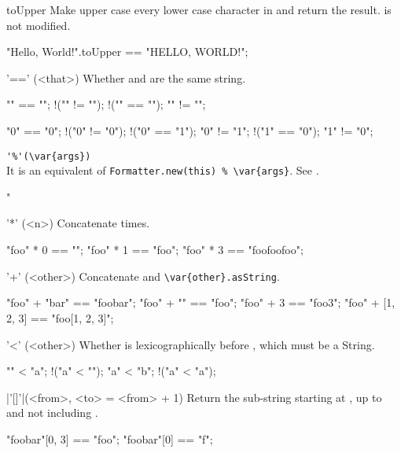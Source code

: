 \begin{urbiscriptapi}
\item[toUpper]
  Make upper case every lower case character in \this and
  return the result.  \this is not modified.
\begin{urbiassert}
"Hello, World!".toUpper == "HELLO, WORLD!";
\end{urbiassert}

\item['=='](<that>)%
  Whether \this and  are the same string.
\begin{urbiassert}
  "" == "";        !("" != "");
!("" == "\0");       "" != "\0";

  "0" == "0";      !("0" != "0");
!("0" == "1");       "0" != "1";
!("1" == "0");       "1" != "0";
\end{urbiassert}

\item \lstinline|'%'(\var{args})|\\
  It is an equivalent of \lstinline|Formatter.new(this) % \var{args}|.
  See .
\begin{urbiassert}
"%
\end{urbiassert}

\item['*'](<n>)%
  Concatenate \this {} times.
\begin{urbiassert}
"foo" * 0 == "";
"foo" * 1 == "foo";
"foo" * 3 == "foofoofoo";
\end{urbiassert}

\item['+'](<other>)%
  Concatenate \this and \lstinline|\var{other}.asString|.
\begin{urbiassert}
"foo" + "bar" == "foobar";
"foo" + "" == "foo";
"foo" + 3 == "foo3";
"foo" + [1, 2, 3] == "foo[1, 2, 3]";
\end{urbiassert}

\item['<'](<other>)%
  Whether \this is lexicographically before ,
  which must be a String.
\begin{urbiassert}
"" < "a";
!("a" < "");
"a" < "b";
!("a" < "a");
\end{urbiassert}

\item|'[]'|(<from>, <to> = <from> + 1)%
  Return the sub-string starting at , up to and not including
  .
\begin{urbiassert}
"foobar"[0, 3] == "foo";
"foobar"[0] == "f";
\end{urbiassert}


\end{urbiscriptapi}
